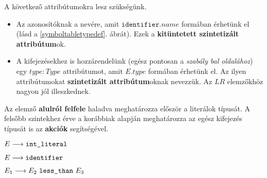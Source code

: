 A következő attribútumokra lesz szükségünk.
\begin{itemize}
	\item Az azonosítóknak a nevére, amit $\texttt{identifier}.name$ formában érhetünk el (lásd a \ref{symboltabletypedef}. ábrát). Ezek a \textbf{kitüntetett szintetizált attribútum}ok.
	\item A kifejezésekhez is hozzárendelünk (egész pontosan a \textit{szabály bal oldalához}) egy $type:Type$ attribútumot, amit $E.type$ formában érhetünk el. Az ilyen attribútumokat \textbf{szintetizált attribútum}oknak nevezzük. Az $LR$ elemzőkhöz nagyon jól illeszkednek.
\end{itemize}

Az elemző \textbf{alulról felfele} haladva meghatározza először a literálok típusát. A felsőbb szintekhez érve a korábbiak alapján meghatározza az egész kifejezés típusát is az \textbf{akciók} segítségével. 



\begin{stuki*}[14cm]{$E \longrightarrow \texttt{int\_literal}$}
\end{stuki*}

\begin{stuki*}[14cm]{$E \longrightarrow \texttt{identifier}$}
	\begin{IF}[20]{2}{}
		\ELSE
	\end{IF}
\end{stuki*}

\begin{stuki*}[14cm]{$E_1 \longrightarrow E_2 ~ \texttt{less\_than} ~ E_3$}
	\begin{IF}[20]{2}{}
		\ELSE
	\end{IF}
\end{stuki*}

